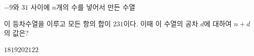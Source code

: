 $-9$와 $31$ 사이에 $n$개의 수를 넣어서 만든 수열 \par\smallskip{}\par\smallskip\noindent 이 등차수열을 이루고 모든 항의 합이 $231$이다. 이때 이 수열의 공차 $d$에 대하여 $n+d$의 값은?
\begin{choices32}{$18$}{$19$}{$20$}{$21$}{$22$}\end{choices32}
